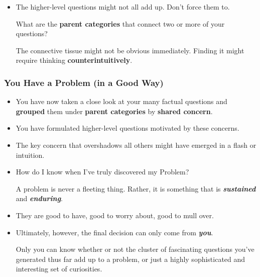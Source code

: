 \documentclass[11pt]{article}
\begin{document}
\begin{itemize}
\begin{exercise}
\begin{itemize}
\item The higher-level questions might not all add up. Don’t force them to. 

What are the \textbf{parent categories} that connect two or more of your questions? 

The connective tissue might not be obvious immediately. Finding it might require thinking \textbf{counterintuitively}.
\end{itemize}
\end{exercise}
\end{itemize}
\subsubsection{You Have a Problem (in a Good Way)}
\begin{itemize}
\item You have now taken a close look at your many factual questions and \textbf{grouped} them under \textbf{parent categories} by \textbf{shared concern}. 

\item You have formulated higher-level questions motivated by these concerns.

\item The key concern that overshadows all others might have emerged in a flash or intuition. 

\item How do I know when I’ve truly discovered my Problem?

A problem is never a fleeting thing. Rather, it is something that is \textbf{\emph{sustained}} and \textbf{\emph{enduring}}.

\item They are good to have, good to worry about, good to mull over.

\item Ultimately, however, the final decision can only come from \textbf{\emph{you}}. 

Only you can know whether or not the cluster of fascinating questions you’ve generated thus far add up to a problem, or just a highly sophisticated and interesting set of curiosities.
\end{itemize}
\end{document}
